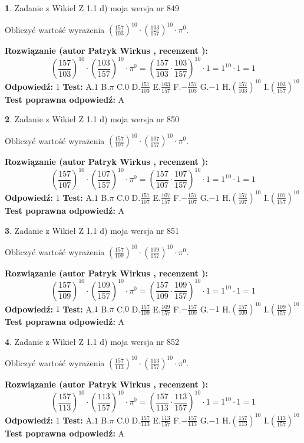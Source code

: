 \documentclass[12pt, a4paper]{article}
\theoremstyle{definition} %
\newtheorem{zad}{}
\newcommand{\zadStart}[1]{\begin{zad}#1\newline}
\newcommand{\zadStop}{\end{zad}}
\newcommand{\rozwStart}[2]{\noindent \textbf{Rozwiązanie (autor #1 , recenzent #2): }\newline}
\newcommand{\rozwStop}{\newline}
\newcommand{\odpStart}{\noindent \textbf{Odpowiedź:}\newline}
\newcommand{\odpStop}{\newline}
\newcommand{\testStart}{\noindent \textbf{Test:}\newline}
\newcommand{\testStop}{\newline}
\newcommand{\kluczStart}{\noindent \textbf{Test poprawna odpowiedź:}\newline}
\newcommand{\kluczStop}{\newline}
\begin{document}
\zadStart{Zadanie z Wikieł Z 1.1 d) moja wersja nr 849}

Obliczyć wartość wyrażenia $(\frac{157}{103})^{10} \cdot (\frac{103}{157})^{10} \cdot \pi^{0}$.
\zadStop
\rozwStart{Patryk Wirkus}{}
$$(\frac{157}{103})^{10} \cdot (\frac{103}{157})^{10} \cdot \pi^{0} = (\frac{157}{103} \cdot \frac{103}{157})^{10} \cdot 1 = 1^{10} \cdot 1 = 1$$
\rozwStop
\odpStart
$1$
\odpStop
\testStart
A.$1$ B.$\pi$ C.$0$ D.$\frac{157}{103}$ E.$\frac{103}{157}$
F.$-\frac{157}{103}$ G.$-1$
H.$(\frac{157}{103})^{10}$
I.$(\frac{103}{157})^{10}$
\testStop
\kluczStart
A
\kluczStop



\zadStart{Zadanie z Wikieł Z 1.1 d) moja wersja nr 850}

Obliczyć wartość wyrażenia $(\frac{157}{107})^{10} \cdot (\frac{107}{157})^{10} \cdot \pi^{0}$.
\zadStop
\rozwStart{Patryk Wirkus}{}
$$(\frac{157}{107})^{10} \cdot (\frac{107}{157})^{10} \cdot \pi^{0} = (\frac{157}{107} \cdot \frac{107}{157})^{10} \cdot 1 = 1^{10} \cdot 1 = 1$$
\rozwStop
\odpStart
$1$
\odpStop
\testStart
A.$1$ B.$\pi$ C.$0$ D.$\frac{157}{107}$ E.$\frac{107}{157}$
F.$-\frac{157}{107}$ G.$-1$
H.$(\frac{157}{107})^{10}$
I.$(\frac{107}{157})^{10}$
\testStop
\kluczStart
A
\kluczStop



\zadStart{Zadanie z Wikieł Z 1.1 d) moja wersja nr 851}

Obliczyć wartość wyrażenia $(\frac{157}{109})^{10} \cdot (\frac{109}{157})^{10} \cdot \pi^{0}$.
\zadStop
\rozwStart{Patryk Wirkus}{}
$$(\frac{157}{109})^{10} \cdot (\frac{109}{157})^{10} \cdot \pi^{0} = (\frac{157}{109} \cdot \frac{109}{157})^{10} \cdot 1 = 1^{10} \cdot 1 = 1$$
\rozwStop
\odpStart
$1$
\odpStop
\testStart
A.$1$ B.$\pi$ C.$0$ D.$\frac{157}{109}$ E.$\frac{109}{157}$
F.$-\frac{157}{109}$ G.$-1$
H.$(\frac{157}{109})^{10}$
I.$(\frac{109}{157})^{10}$
\testStop
\kluczStart
A
\kluczStop



\zadStart{Zadanie z Wikieł Z 1.1 d) moja wersja nr 852}

Obliczyć wartość wyrażenia $(\frac{157}{113})^{10} \cdot (\frac{113}{157})^{10} \cdot \pi^{0}$.
\zadStop
\rozwStart{Patryk Wirkus}{}
$$(\frac{157}{113})^{10} \cdot (\frac{113}{157})^{10} \cdot \pi^{0} = (\frac{157}{113} \cdot \frac{113}{157})^{10} \cdot 1 = 1^{10} \cdot 1 = 1$$
\rozwStop
\odpStart
$1$
\odpStop
\testStart
A.$1$ B.$\pi$ C.$0$ D.$\frac{157}{113}$ E.$\frac{113}{157}$
F.$-\frac{157}{113}$ G.$-1$
H.$(\frac{157}{113})^{10}$
I.$(\frac{113}{157})^{10}$
\testStop
\kluczStart
A
\kluczStop
\end{document}
